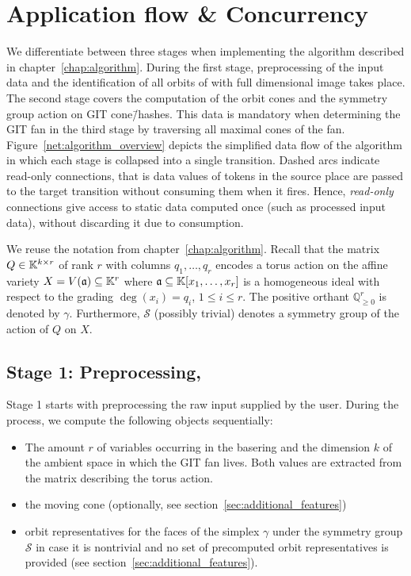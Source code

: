\section{Application flow \& Concurrency}

We differentiate between three stages when implementing the algorithm described in chapter~\ref{chap:algorithm}. During the first stage, preprocessing of the input data and the identification of all orbits of \afaces{} with full dimensional image takes place. The second stage covers the computation of the orbit cones and the symmetry group action on GIT cone\=/hashes. This data is mandatory when determining the GIT fan in the third stage by traversing all maximal cones of the fan. Figure~\ref{net:algorithm_overview} depicts the simplified data flow of the algorithm in which each stage is collapsed into a single transition. Dashed arcs indicate read-only connections, that is data values of tokens in the source place are passed to the target transition without consuming them when it fires. Hence, \emph{read-only} connections give access to static data computed once (such as processed input data), without discarding it due to consumption.



We reuse the notation from chapter~\ref{chap:algorithm}. Recall that the matrix $Q\in\mathbb{K}^{k\times r}$ of rank $r$ with columns $q_1,\dots,q_r$ encodes a torus action on the affine variety $X = V(\mathfrak{a})\subseteq \mathbb{K}^r$ where $\mathfrak{a}\subseteq \mathbb{K}[x_1,\dots,x_r]$ is a homogeneous ideal with respect to the grading $\deg(x_i) = q_i$, $1\leq i\leq r$. The positive orthant $\mathbb{Q}_{\geq 0}^r$ is denoted by $\gamma$. Furthermore, $\mathcal{S}$ (possibly trivial) denotes a symmetry group of the action of $Q$ on $X$. 

\subsection*{Stage 1: Preprocessing, \afaces}
Stage 1 starts with preprocessing the raw input supplied by the user. During the process, we compute the following objects sequentially:
\begin{itemize}
	\item The amount $r$ of variables occurring in the basering and the dimension $k$ of the ambient space in which the GIT fan lives. Both values are extracted from the matrix describing the torus action.
	\item the moving cone (optionally, see section~\ref{sec:additional_features})
	\item orbit representatives for the faces of the simplex $\gamma$ under the symmetry group $\mathcal{S}$ in case it is nontrivial and no set of precomputed orbit representatives is provided (see section~\ref{sec:additional_features}).
\end{itemize}

